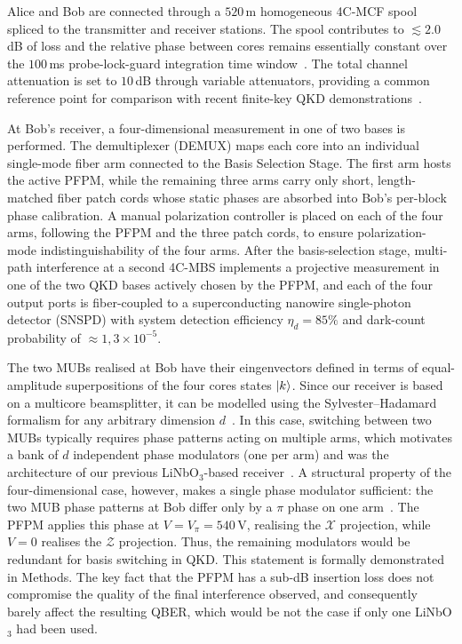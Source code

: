\documentclass[pra,aps,reprint,nofootinbib,superscriptaddress,floatfix]{revtex4-2}
\newcommand{\Vpi}{V_{\pi}}
\begin{document}
Alice and Bob are connected through a $520\,$m homogeneous 4C-MCF spool spliced to the transmitter and receiver stations. The spool contributes to $\lesssim 2.0\,$dB of loss and the relative phase between cores remains essentially constant over the $100\,$ms probe-lock-guard integration time window~\cite{dosSantos2026}. The total channel attenuation is set to $10\,$dB through variable attenuators, providing a common reference point for comparison with recent finite-key QKD demonstrations~\cite{Islam2017TimeBinQudits,Zahidy2024DeployedHDQKD,dosSantos2026,Li2023HighRate110Mbps,Zhang2025SPS,DaLio2021PathMCF}.

At Bob's receiver, a four-dimensional measurement in one of two bases is performed. The demultiplexer (DEMUX) maps each core into an individual single-mode fiber arm connected to the Basis Selection Stage. The first arm hosts the active PFPM, while the remaining three arms carry only short, length-matched fiber patch cords whose static phases are absorbed into Bob's per-block phase calibration. A manual polarization controller is placed on each of the four arms, following the PFPM and the three patch cords, to ensure polarization-mode indistinguishability of the four arms. After the basis-selection stage, multi-path interference at a second 4C-MBS implements a projective measurement in one of the two QKD bases actively chosen by the PFPM, and each of the four output ports is fiber-coupled to a superconducting nanowire single-photon detector (SNSPD) with system detection efficiency $\eta_d = 85\%$ and dark-count probability of $\approx 1{,}3 \times 10^{-5}$.

The two MUBs realised at Bob have their eingenvectors defined in terms of equal-amplitude superpositions of the four cores states $\ket{k}$. Since our receiver is based on a multicore beamsplitter, it can be modelled using the Sylvester--Hadamard formalism for any arbitrary dimension $d$~\cite{Horadam2007,Carine2020}. In this case, switching between two MUBs typically requires phase patterns acting on multiple arms, which motivates a bank of $d$ independent phase modulators (one per arm) and was the architecture of our previous LiNbO$_3$-based receiver~\cite{dosSantos2026}. A structural property of the four-dimensional case, however, makes a single phase modulator sufficient: the two MUB phase patterns at Bob differ only by a $\pi$ phase on one arm~\cite{Canas2017,Carine2020,dosSantos2026}. The PFPM applies this phase at $V = \Vpi = 540\,$V, realising the $\mathcal{X}$ projection, while $V = 0$ realises the $\mathcal{Z}$ projection. Thus, the remaining modulators would be redundant for basis switching in QKD. This statement is formally demonstrated in Methods. The key fact that the PFPM has a sub-dB insertion loss does not compromise the quality of the final interference observed, and consequently barely affect the resulting QBER, which would be not the case if only one LiNbO$_3$ had been used.
\end{document}
